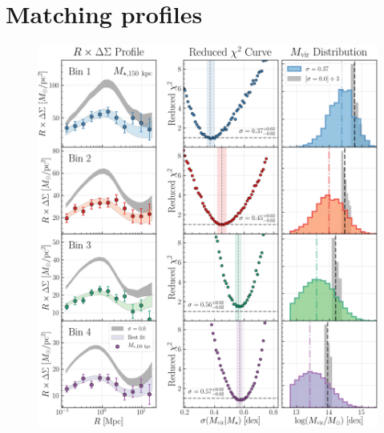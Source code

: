 \documentclass[a4paper,fleqn,usenatbib]{mnras}
\begin{document}




\appendix

\section{Matching \dsigma{} profiles} 
	\label{app:fitting} 
    

  \begin{figure}
      \centering 
      \includegraphics[width=\textwidth]{figure/topn_dsigma_m150_fit}
      \caption{
          }
      \label{fig:fitting}
  \end{figure}
    
\end{document}
